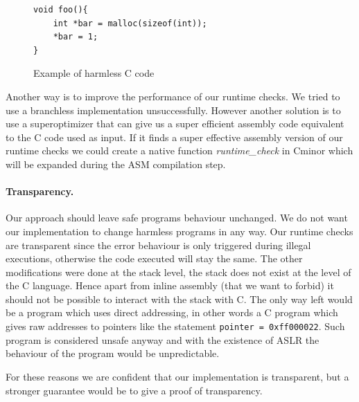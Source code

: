 \documentclass[11pt]{sdm}
\begin{document}
\begin{figure}[!ht]
\begin{lstlisting}
void foo(){
	int *bar = malloc(sizeof(int));
	*bar = 1;
}
\end{lstlisting}
\centering
\caption{Example of harmless C code }
\label{harmless}
\end{figure}

\hfill \break
Another way is to improve the performance of our runtime checks. We tried to use a branchless implementation unsuccessfully. However another solution is to use a superoptimizer that can give us a super efficient assembly code equivalent to the C code used as input. If it finds a super effective assembly version of our runtime checks we could create a native function \textit{runtime\_check} in Cminor which will be expanded during the ASM compilation step.

\paragraph{Transparency.}
\label{par:Transparency}
Our approach should leave safe programs behaviour unchanged. We do not want our implementation to change harmless programs in any way. Our runtime checks are transparent since the error behaviour is only triggered during illegal executions, otherwise the code executed will stay the same. The other modifications were done at the stack level, the stack does not exist at the level of the C language.
Hence apart from inline assembly (that we want to forbid) it should not be possible to interact with the stack with C. The only way left would be a program which uses direct addressing, in other words a C program which gives raw addresses to pointers like the statement \texttt{pointer = 0xff000022}.
Such program is considered unsafe anyway and with the existence of ASLR the behaviour of the program would be unpredictable.

For these reasons we are confident that our implementation is transparent, but a stronger guarantee would be to give a proof of transparency.

\newpage
\end{document}
